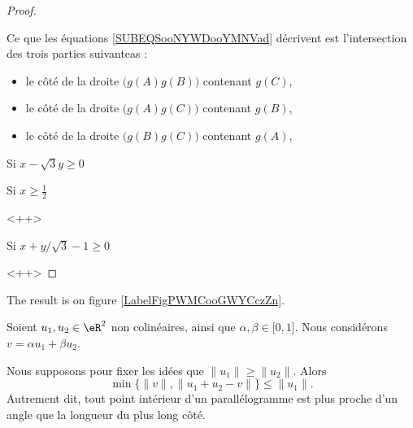 \begin{proof}
\begin{subproof}
\begin{subproof}
\begin{subproof}
\begin{subequations}
                            \end{subequations}
                            Ce que les équations \eqref{SUBEQSooNYWDooYMNVad} décrivent est l'intersection des trois parties suivanteas :
                            \begin{itemize}
                                \item le côté de la droite \( \big( g(A)g(B)\big)\) contenant \( g(C)\),
                                \item le côté de la droite \( \big( g(A)g(C)\big)\) contenant \( g(B)\),
                                \item le côté de la droite \( \big( g(B)g(C)\big)\) contenant \( g(A)\),
                            \end{itemize}
                            
                        \item[Si \( x-\sqrt{ 3 }y\geq 0\)]
                    \end{subproof}
                     
                \item[Si \( x\geq \frac{ 1 }{2}\)]
            \end{subproof}
            <++>
        \item[Si \( x+y/\sqrt{ 3 }-1\geq 0\)]
    \end{subproof}
    <++>
\end{proof}




The result is on figure \ref{LabelFigPWMCooGWYCczZn}. %
\newcommand{\CaptionFigPWMCooGWYCczZn}{<+Type your caption here+>}



\begin{lemma}        \label{LEMooEKWZooYbcGBp}
    Soient \( u_1,u_2\in \eR^2\) non colinéaires, ainsi que \( \alpha,\beta\in \mathopen[ 0 , 1 \mathclose]\). Nous considérons \( v=\alpha u_1+\beta u_2\).

    Nous supposons pour fixer les idées que \( \| u_1 \|\geq \| u_2 \|\). Alors
    \begin{equation}
        \min\{ \| v \|, \| u_1+u_2-v \| \}\leq \| u_1 \|.
    \end{equation}
    Autrement dit, tout point intérieur d'un parallélogramme est plus proche d'un angle que la longueur du plus long côté.
\end{lemma}

